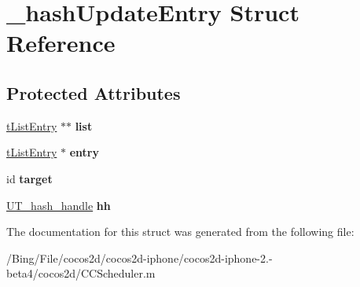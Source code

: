 \hypertarget{struct__hash_update_entry}{\section{\-\_\-hash\-Update\-Entry Struct Reference}
\label{struct__hash_update_entry}
}
\subsection*{Protected Attributes}
\begin{DoxyCompactItemize}
\item 
\hypertarget{struct__hash_update_entry_a2458362fa5e02fd614fdbb0ee298ecb9}{\hyperlink{struct__list_entry}{t\-List\-Entry} $\ast$$\ast$ {\bfseries list}}\label{struct__hash_update_entry_a2458362fa5e02fd614fdbb0ee298ecb9}

\item 
\hypertarget{struct__hash_update_entry_a10d768b6279682ca73cfde8702788a6a}{\hyperlink{struct__list_entry}{t\-List\-Entry} $\ast$ {\bfseries entry}}\label{struct__hash_update_entry_a10d768b6279682ca73cfde8702788a6a}

\item 
\hypertarget{struct__hash_update_entry_a59e46e494605bb1a91eea5a25eef0941}{id {\bfseries target}}\label{struct__hash_update_entry_a59e46e494605bb1a91eea5a25eef0941}

\item 
\hypertarget{struct__hash_update_entry_aa81fb210b05621f4aaa098a44a156e49}{\hyperlink{struct_u_t__hash__handle}{U\-T\-\_\-hash\-\_\-handle} {\bfseries hh}}\label{struct__hash_update_entry_aa81fb210b05621f4aaa098a44a156e49}

\end{DoxyCompactItemize}


The documentation for this struct was generated from the following file\-:\begin{DoxyCompactItemize}
\item 
/\-Bing/\-File/cocos2d/cocos2d-\/iphone/cocos2d-\/iphone-\/2.-\/beta4/cocos2d/C\-C\-Scheduler.\-m\end{DoxyCompactItemize}
